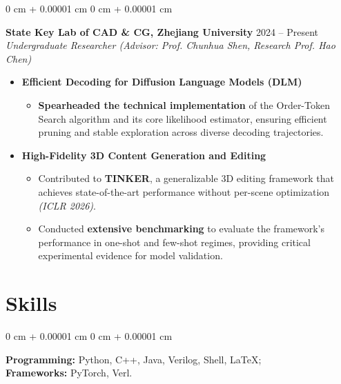 \documentclass[11pt, letterpaper]{article}
\newenvironment{highlights}{
    \begin{itemize}[
        topsep=0 cm,
        parsep=0 cm,
        partopsep=0pt,
        itemsep=0pt,
        leftmargin=0 cm + 10pt
    ]
}{
    \end{itemize}
}
\newenvironment{onecolentry}{
    \begin{adjustwidth}{
        0 cm + 0.00001 cm
    }{
        0 cm + 0.00001 cm
    }
}{
    \end{adjustwidth}
}
\begin{document}
        \begin{onecolentry}
            \textbf{State Key Lab of CAD \& CG, Zhejiang University}
            \hfill 2024 -- Present \\

            \textit{Undergraduate Researcher
            (Advisor: Prof. Chunhua Shen, Research Prof. Hao Chen)}

            \begin{highlights}

                \item \textbf{Efficient Decoding for Diffusion Language Models (DLM)}
                \begin{itemize}
                    \item \textbf{Spearheaded the technical implementation}
                    of the Order-Token Search algorithm and its core likelihood estimator,
                    ensuring efficient pruning and stable exploration across diverse
                    decoding trajectories.
                \end{itemize}

                \item \textbf{High-Fidelity 3D Content Generation and Editing}
                \begin{itemize}
                    \item Contributed to \textbf{TINKER}, a generalizable 3D editing
                    framework that achieves state-of-the-art performance without
                    per-scene optimization \textit{(ICLR 2026)}.

                    \item Conducted \textbf{extensive benchmarking} to evaluate the
                    framework's performance in one-shot and few-shot regimes,
                    providing critical experimental evidence for model validation.
                \end{itemize}

            \end{highlights}
        \end{onecolentry}


    \section{Skills}

        \begin{onecolentry}
            \textbf{Programming:} Python, C++, Java, Verilog, Shell, \LaTeX; \\
            \textbf{Frameworks:} PyTorch, Verl.
        \end{onecolentry}
\end{document}
